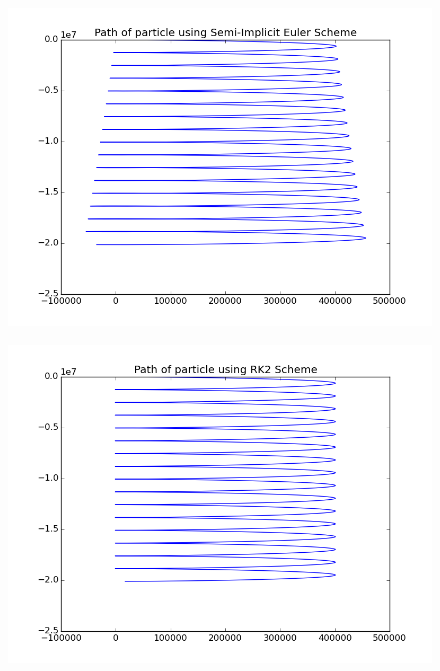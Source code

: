 \documentclass[11pt, a4paper]{article}
\begin{document}
\begin{figure}[H]
 \centering
 \includegraphics[width = \textwidth]{q3_euler2.png}
\end{figure}
\begin{figure}[H]
 \centering
 \includegraphics[width = \textwidth]{q3_RK2.png}
\end{figure}
\end{document}
